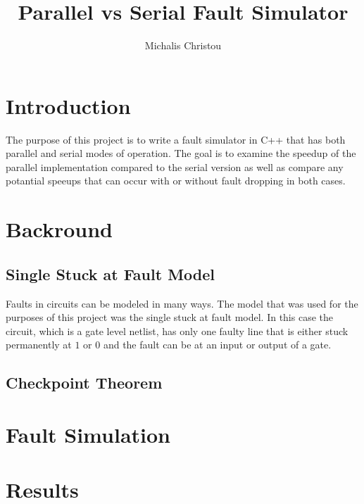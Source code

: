 \documentclass{article}
\author{Michalis Christou}
\title{Parallel vs Serial Fault Simulator}
\begin{document}
\maketitle

\section*{Introduction}
The purpose of this project is to write a fault simulator in C++ that has both parallel and serial modes of operation. The goal is to examine the speedup of the parallel implementation compared to the serial version as well as compare any potantial speeups that can occur with or without fault dropping in both cases.


\section*{Backround}
\subsection*{Single Stuck at Fault Model}
Faults in circuits can be modeled in many ways. The model that was used for the purposes of this project was the single stuck at fault model. In this case the circuit, which is a gate level netlist, has only one faulty line that is either stuck permanently at $1$ or $0$ and the fault can be at an input or output of a gate.

\subsection*{Checkpoint Theorem}


\section*{Fault Simulation}



\section*{Results}
\end{document}
